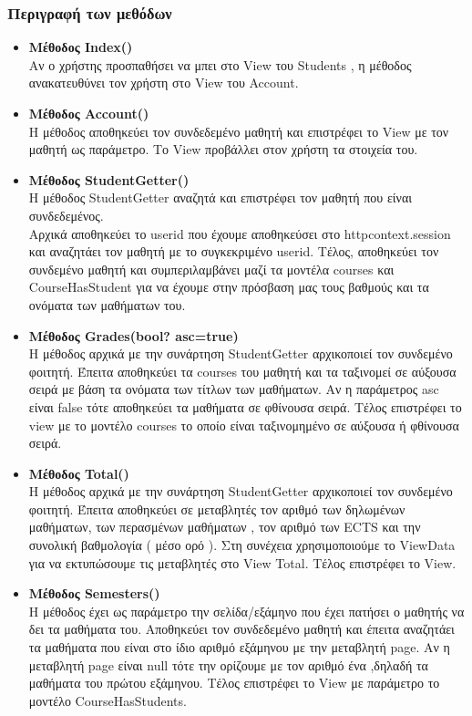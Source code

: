 \documentclass[12pt]{article}
\begin{document}
	\subsubsection{Περιγραφή των μεθόδων}
	
	\begin{itemize}
		
		\item \textbf{Μέθοδος Index()}\\				
		Αν ο χρήστης προσπαθήσει να μπει στο View του Students , η μέθοδος ανακατευθύνει τον χρήστη στο View του Account.
		
		\item	\textbf{Μέθοδος Account()}\\
		Η μέθοδος αποθηκεύει τον συνδεδεμένο μαθητή και επιστρέφει το View με τον μαθητή ως παράμετρο. Το View προβάλλει στον χρήστη τα στοιχεία του.
		
		\item \textbf{Μέθοδος StudentGetter()}\\		
		Η μέθοδος StudentGetter αναζητά και επιστρέφει τον μαθητή που είναι συνδεδεμένος.\\
		Αρχικά αποθηκεύει το userid που έχουμε αποθηκεύσει στο httpcontext.session και αναζητάει τον μαθητή με το συγκεκριμένο userid. Τέλος, αποθηκεύει τον συνδεμένο μαθητή και συμπεριλαμβάνει μαζί τα μοντέλα courses και CourseHasStudent για να έχουμε στην πρόσβαση μας τους βαθμούς και τα ονόματα των μαθήματων του.

		\item \textbf{Μέθοδος Grades(bool? asc=true)}\\
		Η μέθοδος αρχικά με την συνάρτηση StudentGetter αρχικοποιεί τον συνδεμένο φοιτητή. Έπειτα αποθηκεύει τα courses του μαθητή και τα ταξινομεί σε αύξουσα σειρά με βάση τα ονόματα των τίτλων των μαθήματων. Αν η παράμετρος asc είναι false τότε αποθηκεύει τα μαθήματα σε φθίνουσα σειρά. Τέλος επιστρέφει το view με το μοντέλο courses το οποίο είναι ταξινομημένο σε αύξουσα ή φθίνουσα σειρά.
			
		\item \textbf{Μέθοδος Total()}\\
		Η μέθοδος αρχικά με την συνάρτηση StudentGetter αρχικοποιεί τον συνδεμένο φοιτητή. Έπειτα αποθηκεύει σε μεταβλητές τον αριθμό των δηλωμένων μαθήματων, των περασμένων μαθήματων , τον αριθμό των ECTS και την συνολική βαθμολογία ( μέσο ορό ). Στη συνέχεια χρησιμοποιούμε το ViewData για να εκτυπώσουμε τις μεταβλητές στο View Total. Τέλος επιστρέφει το View.
		
		\item \textbf{Μέθοδος Semesters()}\\
		Η μέθοδος έχει ως παράμετρο την σελίδα/εξάμηνο που έχει πατήσει ο μαθητής να δει τα μαθήματα του. Αποθηκεύει τον συνδεδεμένο μαθητή και έπειτα αναζητάει τα μαθήματα που είναι στο ίδιο αριθμό εξάμηνου με την μεταβλητή page. Αν η μεταβλητή page είναι null τότε την ορίζουμε με τον αριθμό ένα ,δηλαδή τα μαθήματα του πρώτου εξάμηνου. Τέλος επιστρέφει το View με παράμετρο το μοντέλο CourseHasStudents.
		
	\end{itemize}
\end{document}
